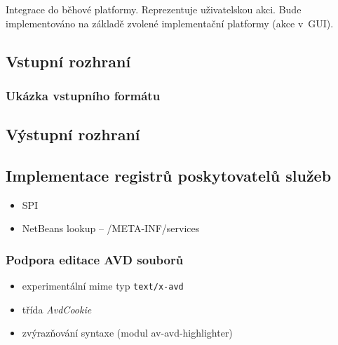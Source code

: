 Integrace do běhové platformy. Reprezentuje uživatelskou akci. Bude implementováno na základě zvolené implementační platformy (akce v~GUI).

\subsection{Vstupní rozhraní}
\subsubsection{Ukázka vstupního formátu}


\subsection{Výstupní rozhraní}

\subsection{Implementace registrů poskytovatelů služeb}
\begin{itemize}
\item SPI
\item NetBeans lookup -- /META-INF/services
\end{itemize}

\subsubsection{Podpora editace AVD souborů}
\begin{itemize}
\item experimentální mime typ \verb+text/x-avd+
\item třída \emph{AvdCookie}
\item zvýrazňování syntaxe (modul av-avd-highlighter)
\end{itemize}
